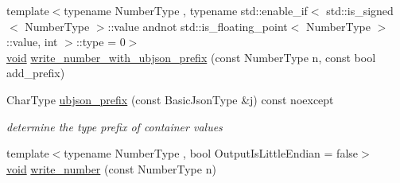 \begin{DoxyCompactItemize}
\item 
{\footnotesize template$<$typename Number\+Type , typename std\+::enable\+\_\+if$<$ std\+::is\+\_\+signed$<$ Number\+Type $>$\+::value andnot std\+::is\+\_\+floating\+\_\+point$<$ Number\+Type $>$\+::value, int $>$\+::type  = 0$>$ }\\\hyperlink{namespacenlohmann_1_1detail_a59fca69799f6b9e366710cb9043aa77d}{void} \hyperlink{classnlohmann_1_1detail_1_1binary__writer_a0ea6745f944c0c61672146886b4ee90f}{write\+\_\+number\+\_\+with\+\_\+ubjson\+\_\+prefix} (const Number\+Type n, const bool add\+\_\+prefix)
\item 
Char\+Type \hyperlink{classnlohmann_1_1detail_1_1binary__writer_a4c129249a5aee8e4ec8add6c6184e4f7}{ubjson\+\_\+prefix} (const Basic\+Json\+Type \&j) const noexcept
\begin{DoxyCompactList}\small\item\em determine the type prefix of container values \end{DoxyCompactList}\item 
{\footnotesize template$<$typename Number\+Type , bool Output\+Is\+Little\+Endian = false$>$ }\\\hyperlink{namespacenlohmann_1_1detail_a59fca69799f6b9e366710cb9043aa77d}{void} \hyperlink{classnlohmann_1_1detail_1_1binary__writer_a6e11b7227fcecc25a548ed45507b7d1c}{write\+\_\+number} (const Number\+Type n)
\end{DoxyCompactItemize}
